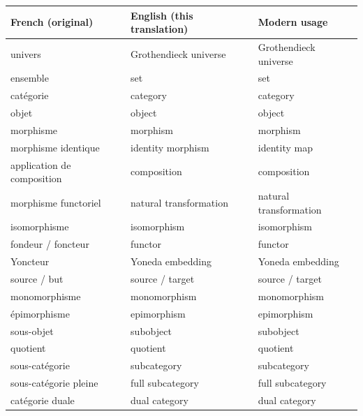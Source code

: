 \begin{table}[htbp]
  \centering
  \small
  \begin{tabular}{p{} p{} p{}}
    \hline
    \textbf{French (original)} & \textbf{English (this translation)} & \textbf{Modern usage}\\[2pt]
    \hline
    univers                     & Grothendieck universe       & Grothendieck universe\\
    ensemble                    & set                          & set\\
    catégorie                   & category                     & category\\
    objet                       & object                       & object\\
    morphisme                   & morphism                     & morphism\\
    morphisme identique         & identity morphism            & identity map\\
    application de composition & composition                  & composition\\
    morphisme functoriel        & natural transformation       & natural transformation\\
    isomorphisme                & isomorphism                 & isomorphism\\
    fondeur / foncteur          & functor                      & functor\\
    Yoncteur                    & Yoneda embedding             & Yoneda embedding\\
    source / but                & source / target              & source / target\\
    mono\-morphisme             & monomorphism                 & monomorphism\\
    épi\-morphisme              & epimorphism                  & epimorphism\\
    sous-objet                  & subobject                    & subobject\\
    quotient                    & quotient                     & quotient\\
    sous-catégorie              & subcategory                 & subcategory\\
    sous-catégorie pleine       & full subcategory             & full subcategory\\
    catégorie duale             & dual category                & dual category\\

\end{tabular}
\end{table}
